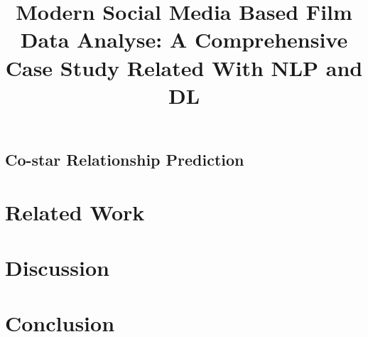 \documentclass[sigconf]{acmart}
\title{Modern Social Media Based Film Data Analyse: A Comprehensive Case Study Related With NLP and DL}
\begin{document}
\maketitle









\subsection{Co-star Relationship Prediction}



\section{Related Work}

\section{Discussion}

\section{Conclusion}

%
%
\end{document}
